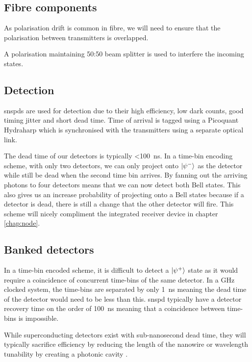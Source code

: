 \subsection{Fibre components}

As polarisation drift is common in fibre, we will need to ensure that the polarisation between transmitters is overlapped. 

A polarisation maintaining 50:50 beam splitter is used to interfere the incoming states.

\subsection{Detection}

\Acsp{snspd} are used for detection due to their high efficiency, low dark counts, good timing jitter and short dead time. Time of arrival is tagged using a Picoquant Hydraharp which is synchronised with the transmitters using a separate optical link.

The dead time of our detectors is typically \SI{<100}{ns}. In a time-bin encoding scheme, with only two detectors, we can only project onto $\ket{\psi^{-}}$ as the detector while still be dead when the second time bin arrives. By fanning out the arriving photons to four detectors means that we can now detect both Bell states. This also gives us an increase probability of projecting onto a Bell states because if a detector is dead, there is still a change that the other detector will fire. This scheme will nicely compliment the integrated receiver device in chapter \ref{chap:node}.

\subsection{Banked detectors}

In a time-bin encoded scheme, it is difficult to detect a $\ket{\psi^+}$ state as it would require a coincidence of concurrent time-bins of the same detector. In a GHz clocked system, the time-bins are separated by only \SI{1}{\ns} meaning the dead time of the detector would need to be less than this. \ac{snspd} typically have a detector recovery time on the order of \SI{100}{\ns} meaning that a coincidence between time-bins is impossible. 

While superconducting detectors exist with sub-nanosecond dead time, they will typically sacrifice efficiency by reducing the length of the nanowire \cite{} or wavelength tunability by creating a photonic cavity \cite{}.

